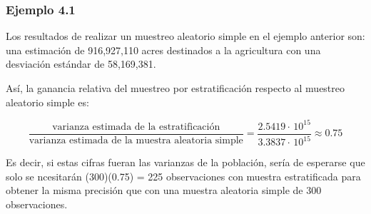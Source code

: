 \documentclass[hyperref={bookmarks=false},aspectratio=169, 10pt]{beamer}
\begin{document}

\begin{frame}
    \frametitle{Ejemplo 4.1}

    Los resultados de realizar un muestreo aleatorio simple en el ejemplo anterior son: una estimación de 916,927,110 acres destinados a la agricultura con una desviación estándar de 58,169,381.

    Así, la ganancia relativa del muestreo por estratificación respecto al muestreo aleatorio simple es:

    \begin{equation*}
        \dfrac{\mbox{varianza estimada de la estratificación}}{\mbox{varianza estimada de la muestra aleatoria simple}} = \dfrac{2.5419 \cdot \, 10^{15}}{3.3837 \cdot \, 10^{15}} \approx 0.75
    \end{equation*}

    Es decir, si estas cifras fueran las varianzas de la población, sería de esperarse que solo se ncesitarán (300)(0.75) = 225 observaciones con muestra estratificada para obtener la misma precisión que con una muestra aleatoria simple de 300 observaciones.
\end{frame}

\frame{}
\end{document}
